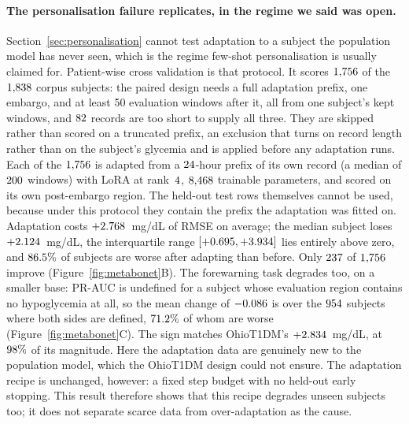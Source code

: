 \paragraph{The personalisation failure replicates, in the regime we said was
open.} Section~\ref{sec:personalisation} cannot test adaptation to a subject the
population model has never seen, which is the regime few-shot personalisation is
usually claimed for. Patient-wise cross validation is that protocol. It scores
$1{,}756$ of the $1{,}838$ corpus subjects: the paired
design needs a full adaptation prefix, one embargo, and at least 50 evaluation
windows after it, all from one subject's kept windows, and $82$ records are too
short to supply all three. They are skipped rather than scored on a truncated
prefix, an exclusion that turns on record length rather than on the subject's
glycemia and is applied before any adaptation runs. Each of the
$1{,}756$ is adapted from a
$24$-hour prefix of its own record (a median of
$200$ windows) with LoRA at rank~$4$,
$8{,}468$ trainable parameters, and scored on its own
post-embargo region. The held-out test rows themselves cannot be used, because
under this protocol they contain the prefix the adaptation was fitted on. Adaptation costs $+2.768$~mg/dL of RMSE on average; the
median subject loses $+2.124$~mg/dL, the interquartile
range $[+0.695, +3.934]$ lies
entirely above zero, and $86.5\%$ of subjects are worse after
adapting than before. Only $237$ of
$1{,}756$ improve (Figure~\ref{fig:metabonet}B). The forewarning
task degrades too, on a smaller base: PR-AUC is undefined for a subject
whose evaluation region contains no hypoglycemia at all, so the mean change of
$-0.086$ is over the $954$ subjects
where both sides are defined, $71.2\%$ of whom are worse
(Figure~\ref{fig:metabonet}C).
The sign matches OhioT1DM's $+2.834$~mg/dL, at
$98\%$ of its magnitude. Here the adaptation data are
genuinely new to the population model, which the OhioT1DM design could not
ensure. The adaptation recipe is unchanged, however: a fixed step budget with no
held-out early stopping. This result therefore shows that this recipe degrades
unseen subjects too; it does not separate scarce data from over-adaptation as
the cause.

